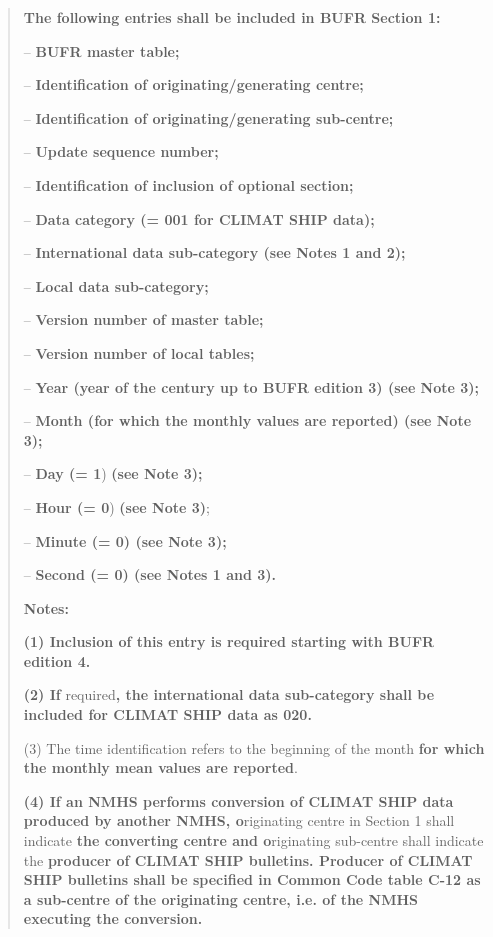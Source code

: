 \begin{quote}
\textbf{The following entries shall be included in BUFR Section 1:}

-- \textbf{BUFR master table;}

-- \textbf{Identification of originating/generating centre;}

-- \textbf{Identification of originating/generating sub-centre;}

-- \textbf{Update sequence number;}

-- \textbf{Identification of inclusion of optional section;}

-- \textbf{Data category (= 001 for CLIMAT SHIP data);}

-- \textbf{International data sub-category (see Notes 1 and 2);}

-- \textbf{Local data sub-category;}

-- \textbf{Version number of master table;}

-- \textbf{Version number of local tables;}

-- \textbf{Year (year of the century up to BUFR edition 3) (see Note 3);}

-- \textbf{Month (for which the monthly values are reported) (see Note 3);}

-- \textbf{Day (= 1}) \textbf{(see Note 3);}

-- \textbf{Hour (= 0}) \textbf{(see Note 3)};

-- \textbf{Minute (= 0) (see Note 3);}

-- \textbf{Second (= 0) (see Notes 1 and 3).}

\textbf{Notes:}

\textbf{(1) Inclusion of this entry is required starting with BUFR edition 4.}

\textbf{(2) If} required\textbf{, the international data sub-category shall be included for CLIMAT SHIP data as 020.}

(3) The time identification refers to the beginning of the month \textbf{for which the monthly mean values are reported}.

\textbf{(4) If an NMHS performs conversion of CLIMAT SHIP data produced by another NMHS, o}riginating centre in Section 1 shall indicate \textbf{the converting centre and o}riginating sub-centre shall indicate the \textbf{producer of CLIMAT SHIP bulletins. Producer of CLIMAT SHIP bulletins shall be specified in Common Code table C-12 as a sub-centre of the originating centre, i.e. of the NMHS executing the conversion.}
\end{quote}

